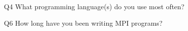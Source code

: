 \begin{description}%
\item{Q4} What programming language(s) do you use most often?%
\item{Q6} How long have you been writing MPI programs?%
\end{description}%
